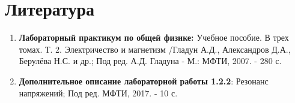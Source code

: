 \documentclass[a4paper, 12pt]{article}%
\begin{document}
\section*{Литература}
\begin{enumerate}
\item \textbf{Лабораторный практикум по общей физике:} Учебное пособие. В трех томах. Т. 2. Электричество и магнетизм /Гладун А.Д., Александров Д.А., Берулёва Н.С. и др.; Под ред. А.Д. Гладуна - М.: МФТИ, 2007. - 280 с.
\item \textbf{Дополнительное описание лабораторной работы 1.2.2}: Резонанс напряжений; Под ред. МФТИ, 2017. - 10 с.
\end{enumerate}
\end{document}
